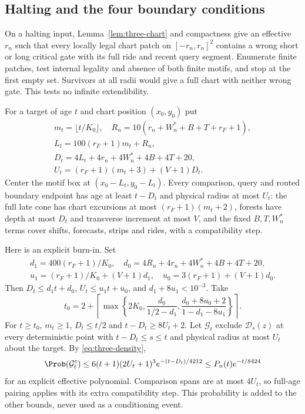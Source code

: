 \subsection{Halting and the four boundary conditions}

On a halting input, Lemma~\ref{lem:three-chart} and compactness give an effective $r_n$ such that every locally legal chart patch on $[-r_n,r_n]^2$ contains a wrong short or long critical gate with its full ride and recent query segment. Enumerate finite patches, test internal legality and absence of both finite motifs, and stop at the first empty set. Survivors at all radii would give a full chart with neither wrong gate. This tests no infinite extendibility.

For a target of age $t$ and chart position $(x_0,y_0)$ put
\[
 \begin{gathered}
 m_t=\lfloor t/K_0\rfloor,\quad R_n=10(r_n+W_n^*+B+T+r_F+1),\\
 L_t=100(r_F+1)m_t+R_n,\\
 D_t=4L_t+4r_n+4W_n^*+4B+4T+20,\\
 U_t=(r_F+1)(m_t+3)+(V+1)D_t.
 \end{gathered}
\]
Center the motif box at $(x_0-L_t,y_0-L_t)$. Every comparison, query and routed boundary endpoint has age at least $t-D_t$ and physical radius at most $U_t$: the full late cone has chart excursions at most $(r_F+1)(m_t+2)$, forests have depth at most $D_t$ and transverse increment at most $V$, and the fixed $B,T,W_n^*$ terms cover shifts, forecasts, strips and rides, with a compatibility step.

Here is an explicit burn-in. Set
\[
 \begin{gathered}
 d_1=400(r_F+1)/K_0,\quad d_0=4R_n+4r_n+4W_n^*+4B+4T+20,\\
 u_1=(r_F+1)/K_0+(V+1)d_1,\quad u_0=3(r_F+1)+(V+1)d_0.
 \end{gathered}
\]
Then $D_t\le d_1t+d_0$, $U_t\le u_1t+u_0$, and $d_1+8u_1<10^{-3}$. Take
\begin{equation}\label{eq:three-burnin}
 t_0=2+\left\lceil\max\left\{2K_0,\frac{d_0}{1/2-d_1},
 \frac{d_0+8u_0+2}{1-d_1-8u_1}\right\}\right\rceil.
\end{equation}
For $t\ge t_0$, $m_t\ge1$, $D_t\le t/2$ and $t-D_t\ge8U_t+2$. Let $\mathcal G_t$ exclude $\mathcal D_s(z)$ at every deterministic point with $t-D_t\le s\le t$ and physical radius at most $U_t$ about the target. By \eqref{eq:three-density},
\begin{equation}\label{eq:three-good-box}
 \Prob(\mathcal G_t^c)\le6(t+1)(2U_t+1)^3e^{-(t-D_t)/4212}
 \le P_n(t)e^{-t/8424}
\end{equation}
for an explicit effective polynomial. Comparison spans are at most $4U_t$, so full-age pairing applies with its extra compatibility step. This probability is added to the other bounds, never used as a conditioning event.

